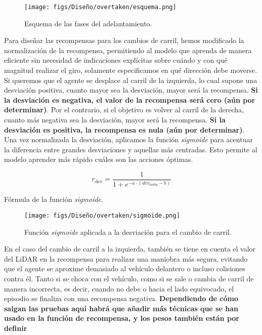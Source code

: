 \begin{figure}[ht]
\centering
\texttt{[image: figs/Diseño/overtaken/esquema.png]}
\caption{Esquema de las fases del adelantamiento.}
\label{fig:esquema_overtaken}
\end{figure}

Para diseñar las recompensas para los cambios de carril, hemos modificado la normalización de la recompensa, permitiendo al modelo que aprenda de manera eficiente sin necesidad de indicaciones explícitas sobre cuándo y con qué magnitud realizar el giro, solamente especificamos en qué dirección debe moverse. Si queremos que el agente se desplace al carril de la izquierda, lo cual supone una desviación positiva, cuanto mayor sea la desviación, mayor será la recompensa. \textbf{Si la desviación es negativa, el valor de la recompensa será cero (aún por determinar)}. Por el contrario, si el objetivo es volver al carril de la derecha, cuanto más negativa sea la desviación, mayor será la recompensa. \textbf{Si la desviación es positiva, la recompensa es nula (aún por determinar)}. Una vez normalizada la desviación, aplicamos la función \textit{sigmoide} para acentuar la diferencia entre grandes desviaciones y aquellas más centradas. Esto permite al modelo aprender más rápido cuáles son las acciones óptimas. 

  \begin{myequation}[H]
    \begin{equation} 
       r_{\text{dev}} = \frac{1}{1 + e^{-a \cdot (dev_{\text{norm}} - b)}}
    \end{equation} 
    \caption{Fórmula de la función \textit{sigmoide}.}
\label{eq:sigmoid_deviation}
  \end{myequation}

\begin{figure}[ht]
\centering
\texttt{[image: figs/Diseño/overtaken/sigmoide.png]}
\caption{Función \textit{sigmoide} aplicada a la desviación para el cambio de carril.}
\label{fig:sigmoide}
\end{figure}

En el caso del cambio de carril a la izquierda, también se tiene en cuenta el valor del \ac{LiDAR} en la recompensa para realizar una maniobra más segura, evitando que el agente se aproxime demasiado al vehículo delantero o incluso colisiones contra él. Tanto si se choca con el vehículo, como si se sale o cambia de carril de manera incorrecta, es decir, cuando no debe o hacia el lado equivocado, el episodio se finaliza con una recompensa negativa. \textbf{Dependiendo de cómo salgan las pruebas aquí habrá que añadir más técnicas que se han usado en la función de recompensa, y los pesos también están por definir}

